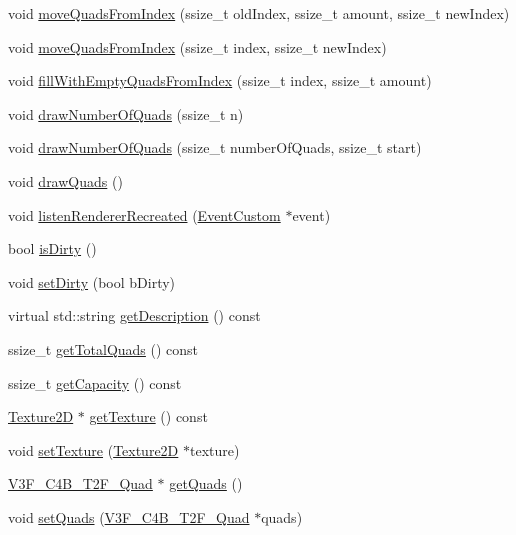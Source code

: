 \begin{DoxyCompactItemize}
\item 
void \hyperlink{classTextureAtlas_a074c3252ea542b77ae254a97917b51df}{move\+Quads\+From\+Index} (ssize\+\_\+t old\+Index, ssize\+\_\+t amount, ssize\+\_\+t new\+Index)
\item 
void \hyperlink{classTextureAtlas_aa4fb28570142da6c7a47aba59a4f021b}{move\+Quads\+From\+Index} (ssize\+\_\+t index, ssize\+\_\+t new\+Index)
\item 
void \hyperlink{classTextureAtlas_ac32f2ddd656d12d187a5ad709c74017b}{fill\+With\+Empty\+Quads\+From\+Index} (ssize\+\_\+t index, ssize\+\_\+t amount)
\item 
void \hyperlink{classTextureAtlas_af240674591a46ea07ab218b702767c5b}{draw\+Number\+Of\+Quads} (ssize\+\_\+t n)
\item 
void \hyperlink{classTextureAtlas_a991e6b2fb3bd3303a7ef27d4f82d3cdc}{draw\+Number\+Of\+Quads} (ssize\+\_\+t number\+Of\+Quads, ssize\+\_\+t start)
\item 
void \hyperlink{classTextureAtlas_a40a5702b4d87530a78f4e117088d41d6}{draw\+Quads} ()
\item 
void \hyperlink{classTextureAtlas_a1ae9b2e2ee16ce31e44171fc248f76a4}{listen\+Renderer\+Recreated} (\hyperlink{classEventCustom}{Event\+Custom} $\ast$event)
\item 
bool \hyperlink{classTextureAtlas_a60f4a4fb09df845856c1f06038df9aac}{is\+Dirty} ()
\item 
void \hyperlink{classTextureAtlas_a8a0b4fcd17e2426ad339ba2d9c4d61c2}{set\+Dirty} (bool b\+Dirty)
\item 
virtual std\+::string \hyperlink{classTextureAtlas_a3a0b4443ac4466d657616396c88264b7}{get\+Description} () const
\item 
ssize\+\_\+t \hyperlink{classTextureAtlas_a4fca29377f79ca2092e36ddd42e31313}{get\+Total\+Quads} () const
\item 
ssize\+\_\+t \hyperlink{classTextureAtlas_a36573b2d198fdf8f8bc118160408ea4b}{get\+Capacity} () const
\item 
\hyperlink{classTexture2D}{Texture2D} $\ast$ \hyperlink{classTextureAtlas_ac2ada75c4c982218c699fa3b97904d95}{get\+Texture} () const
\item 
void \hyperlink{classTextureAtlas_ab55928f2095021b5f733e92e05496457}{set\+Texture} (\hyperlink{classTexture2D}{Texture2D} $\ast$texture)
\item 
\hyperlink{structV3F__C4B__T2F__Quad}{V3\+F\+\_\+\+C4\+B\+\_\+\+T2\+F\+\_\+\+Quad} $\ast$ \hyperlink{classTextureAtlas_ab8e5fd41b1bdfe951eeb40b3be7de50c}{get\+Quads} ()
\item 
void \hyperlink{classTextureAtlas_a59e3e4fea0e05019cfc94bea32122467}{set\+Quads} (\hyperlink{structV3F__C4B__T2F__Quad}{V3\+F\+\_\+\+C4\+B\+\_\+\+T2\+F\+\_\+\+Quad} $\ast$quads)
\end{DoxyCompactItemize}
